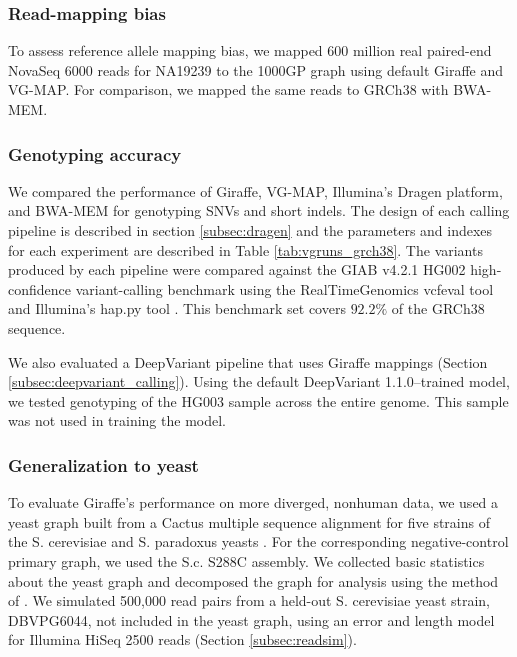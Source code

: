 \documentclass[11pt]{ucscthesis}
\begin{document}
\subsubsection{Read-mapping bias}
To assess reference allele mapping bias, we mapped 600 million real paired-end NovaSeq 6000 reads for NA19239 to the 1000GP graph using default Giraffe and VG-MAP.
For comparison, we mapped the same reads to GRCh38 with BWA-MEM.

\subsubsection{Genotyping accuracy}
\label{subsec:genotyping-accuracy-methods}
We compared the performance of Giraffe, VG-MAP, Illumina’s Dragen platform, and BWA-MEM for genotyping SNVs and short indels.
The design of each calling pipeline is described in section \ref{subsec:dragen} and the parameters and indexes for each experiment are described in Table \ref{tab:vgruns_grch38}.
The variants produced by each pipeline were compared against the GIAB v4.2.1 HG002 high-confidence variant-calling benchmark \cite{wagner_benchmarking_2020} using the RealTimeGenomics vcfeval tool \cite{cleary2015comparing} and Illumina’s hap.py tool \cite{happy_2020}.
This benchmark set covers $92.2\%$ of the GRCh38 sequence.

We also evaluated a DeepVariant \cite{poplin_universal_2018} pipeline that uses Giraffe mappings (Section \ref{subsec:deepvariant_calling}).
Using the default DeepVariant 1.1.0–trained model, we tested genotyping of the HG003 sample across the entire genome.
This sample was not used in training the model.

\subsubsection{Generalization to yeast}
\label{subsec:yeast-methods}
To evaluate Giraffe’s performance on more diverged, nonhuman data, we used a yeast graph built from a Cactus multiple sequence alignment for five strains of the S. cerevisiae and S. paradoxus yeasts \cite{hickey_vgsv_2020}.
For the corresponding negative-control primary graph, we used the S.c. S288C assembly.
We collected basic statistics about the yeast graph and decomposed the graph for analysis using the method of \cite{paten_superbubbles_2018}.
We simulated 500,000 read pairs from a held-out S. cerevisiae yeast strain, DBVPG6044, not included in the yeast graph, using an error and length model for Illumina HiSeq 2500 reads (Section \ref{subsec:readsim}).
\end{document}
